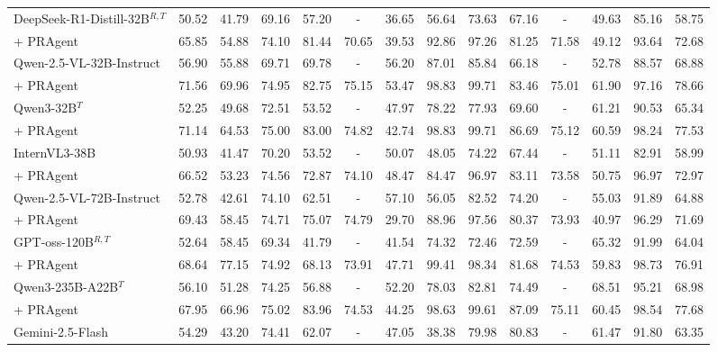 \begin{table*}[t!]
{\begin{tabular}{l|cc|cccccc|cccc|c}
\midrule
DeepSeek-R1-Distill-32B$^{R,T}$ & 50.52 & 41.79 & 69.16 & 57.20 & - & 36.65 & 56.64 & 73.63 & 67.16 & - & 49.63 & 85.16 & 58.75 \\
\rowcolor[rgb]{0.928, 0.936, 0.997}
+ PRAgent & 65.85 & 54.88 & 74.10 & 81.44 & 70.65 & 39.53 & 92.86 & 97.26 & 81.25 & 71.58 & 49.12 & 93.64 & 72.68 \\
\midrule
Qwen-2.5-VL-32B-Instruct & 56.90 & 55.88 & 69.71 & 69.78 & - & 56.20 & 87.01 & 85.84 & 66.18 & - & 52.78 & 88.57 & 68.88 \\
\rowcolor[rgb]{0.928, 0.936, 0.997}
+ PRAgent & 71.56 & 69.96 & 74.95 & 82.75 & 75.15 & 53.47 & 98.83 & 99.71 & 83.46 & 75.01 & 61.90 & 97.16 & 78.66 \\
\midrule
Qwen3-32B$^{T}$ & 52.25 & 49.68 & 72.51 & 53.52 & - & 47.97 & 78.22 & 77.93 & 69.60 & - & 61.21 & 90.53 & 65.34 \\
\rowcolor[rgb]{0.928, 0.936, 0.997}
+ PRAgent & 71.14 & 64.53 & 75.00 & 83.00 & 74.82 & 42.74 & 98.83 & 99.71 & 86.69 & 75.12 & 60.59 & 98.24 & 77.53 \\
\midrule
InternVL3-38B & 50.93 & 41.47 & 70.20 & 53.52 & - & 50.07 & 48.05 & 74.22 & 67.44 & - & 51.11 & 82.91 & 58.99 \\
\rowcolor[rgb]{0.928, 0.936, 0.997}
+ PRAgent & 66.52 & 53.23 & 74.56 & 72.87 & 74.10 & 48.47 & 84.47 & 96.97 & 83.11 & 73.58 & 50.75 & 96.97 & 72.97 \\
\midrule
Qwen-2.5-VL-72B-Instruct & 52.78 & 42.61 & 74.10 & 62.51 & - & 57.10 & 56.05 & 82.52 & 74.20 & - & 55.03 & 91.89 & 64.88 \\
\rowcolor[rgb]{0.928, 0.936, 0.997}
+ PRAgent & 69.43 & 58.45 & 74.71 & 75.07 & 74.79 & 29.70 & 88.96 & 97.56 & 80.37 & 73.93 & 40.97 & 96.29 & 71.69 \\
\midrule
GPT-oss-120B$^{R,T}$ & 52.64 & 58.45 & 69.34 & 41.79 & - & 41.54 & 74.32 & 72.46 & 72.59 & - & 65.32 & 91.99 & 64.04 \\
\rowcolor[rgb]{0.928, 0.936, 0.997}
+ PRAgent & 68.64 & 77.15 & 74.92 & 68.13 & 73.91 & 47.71 & 99.41 & 98.34 & 81.68 & 74.53 & 59.83 & 98.73 & 76.91 \\
\midrule
Qwen3-235B-A22B$^{T}$ & 56.10 & 51.28 & 74.25 & 56.88 & - & 52.20 & 78.03 & 82.81 & 74.49 & - & 68.51 & 95.21 & 68.98 \\
\rowcolor[rgb]{0.928, 0.936, 0.997}
+ PRAgent & 67.95 & 66.96 & 75.02 & 83.96 & 74.53 & 44.25 & 98.63 & 99.61 & 87.09 & 75.11 & 60.45 & 98.54 & 77.68 \\
\midrule
Gemini-2.5-Flash & 54.29 & 43.20 & 74.41 & 62.07 & - & 47.05 & 38.38 & 79.98 & 80.83 & - & 61.47 & 91.80 & 63.35 \\

\end{tabular}}
\end{table*}
